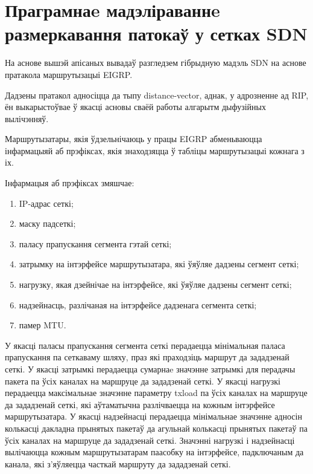 \section{Праграмнаe мадэліраваннe размеркавання патокаў у сетках SDN}

На аснове вышэй апісаных вывадаў разгледзем гібрыдную мадэль SDN
на аснове пратакола маршрутызацыі EIGRP.

Дадзены пратакол адносіцца да тыпу distance-vector, аднак, у адрозненне ад
RIP, ён выкарыстоўвае ў якасці асновы сваёй работы алгарытм дыфузійных вылічэнняў.

Маршрутызатары, якія ўдзельнічаюць у працы EIGRP абменьваюцца інфармацыяй аб прэфіксах, якія знаходзяцца ў табліцы маршрутызацыі кожнага з іх.

Інфармацыя аб прэфіксах змяшчае:
\begin{enumerate}
    \item IP-адрас сеткі;
    \item маску падсеткі;
    \item паласу прапускання сегмента гэтай сеткі;
    \item затрымку на інтэрфейсе маршрутызатара, які ўяўляе дадзены сегмент сеткі;
    \item нагрузку, якая дзейнічае на інтэрфейсе, які ўяўляе дадзены сегмент сеткі;
    \item надзейнасць, разлічаная на інтэрфейсе дадзенага сегмента сеткі;
    \item памер MTU.
\end{enumerate}

У якасці паласы прапускання сегмента сеткі перадаецца мінімальная
паласа прапускання па сеткаваму шляху, праз які праходзіць маршрут да зададзенай сеткі. У якасці затрымкі перадаецца сумарнаe значэнне затрымкі
для перадачы пакета па ўсіх каналах на маршруце да зададзенай сеткі. У якасці нагрузкі перадаецца максімальнае значэнне параметру txload па ўсіх каналах на маршруце да зададзенай сеткі, які аўтаматычна разлічваецца
на кожным інтэрфейсе маршрутызатара. У якасці надзейнасці перадаецца мінімальнае
значэнне адносін колькасці дакладна прынятых пакетаў да агульнай колькасці прынятых пакетаў па ўсіх каналах на маршруце да зададзенай сеткі. Значэнні
нагрузкі і надзейнасці вылічаюцца кожным маршрутызатарам паасобку
на інтэрфейсе, падключаным да канала, які з'яўляецца часткай маршруту
да зададзенай сеткі.
